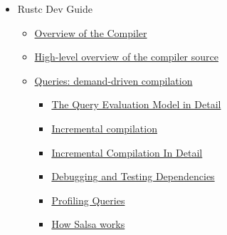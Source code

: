 \documentclass[12pt, a4paper]{report}
\begin{document}
\begin{itemize}[noitemsep]
  \item Rustc Dev Guide
    \begin{itemize}[noitemsep]
    \item \href{https://rustc-dev-guide.rust-lang.org/overview.html}{\Square Overview of the Compiler}
    \item \href{https://rustc-dev-guide.rust-lang.org/compiler-src.html}{\Square High-level overview of the compiler source}
    \item \href{https://rustc-dev-guide.rust-lang.org/query.html}{\Square Queries: demand-driven compilation}
      \begin{itemize}[noitemsep]
      \item \href{https://rustc-dev-guide.rust-lang.org/queries/query-evaluation-model-in-detail.html}{\Square The Query Evaluation Model in Detail}
      \item \href{https://rustc-dev-guide.rust-lang.org/queries/incremental-compilation.html}{\Square Incremental compilation}
      \item \href{https://rustc-dev-guide.rust-lang.org/queries/incremental-compilation-in-detail.html}{\Square Incremental Compilation In Detail}
      \item \href{https://rustc-dev-guide.rust-lang.org/incrcomp-debugging.html}{\Square Debugging and Testing Dependencies}
      \item \href{https://rustc-dev-guide.rust-lang.org/queries/profiling.html}{\Square Profiling Queries}
      \item \href{https://rustc-dev-guide.rust-lang.org/salsa.html}{\Square How Salsa works}
      \end{itemize}
    \end{itemize}


\end{itemize}
\end{document}
